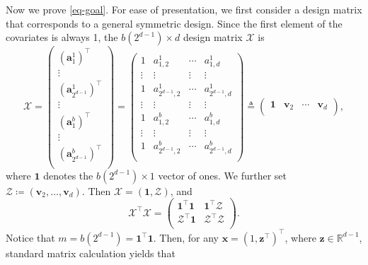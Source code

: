 \documentclass[ijoc,nonblindrev]{informs3}
\def\bx{{\bm x}}
\def\cX{{\mathcal X}}
\def\cZ{{\mathcal Z}}
\def\ba{{\bm a}}
\def\bv{{\bm v}}
\def\bz{{\bm z}}
\def\bone{{\bm 1}}
\begin{document}
Now we prove \eqref{eq-goal}.
For ease of presentation, we first consider a design matrix that corresponds to a general symmetric design.
Since the first element of the covariates is always 1, the $b(2^{d-1}) \times d$ design matrix $\cX$ is
\begin{equation*}
\cX =
\left(
  \begin{array}{c}
    (\ba_1^1)^\intercal \\
    \vdots \\
    (\ba_{2^{d-1}}^1)^\intercal \\
    \vdots \\
    (\ba_1^b)^\intercal \\
    \vdots \\
    (\ba_{2^{d-1}}^b)^\intercal \\
  \end{array}
\right)
=
\left(
  \begin{array}{cccc}
    1 &a_{1,2}^1 & \cdots & a_{1,d}^1 \\
    \vdots & \vdots & \vdots & \vdots \\
    1 & a_{2^{d-1},2}^1 & \cdots & a_{2^{d-1},d}^1 \\
    \vdots & \vdots & \vdots & \vdots \\
    1 & a_{1,2}^b & \cdots & a_{1,d}^b \\
    \vdots & \vdots & \vdots & \vdots \\
    1 & a_{2^{d-1},2}^b & \cdots & a_{2^{d-1},d}^b \\
  \end{array}
\right)
\triangleq
\left(
  \begin{array}{cccc}
    \bone & \bv_2 & \cdots & \bv_d \\
  \end{array}
\right),
\end{equation*}
where $\bone$ denotes the $b(2^{d-1}) \times 1$ vector of ones.
We further set  $\cZ \coloneqq (\bv_2, \ldots, \bv_d)$.
Then $\cX = (\bone, \cZ)$, and
\begin{equation}\label{eq-matrix}
\cX^\intercal \cX =
\left(
  \begin{array}{cc}
    \bone^\intercal \bone & \bone^\intercal \cZ \\
    \cZ^\intercal \bone & \cZ^\intercal \cZ \\
  \end{array}
\right).
\end{equation}
Notice that $m = b(2^{d-1}) = \bone^\intercal \bone$.
Then, for any $\bx = (1, \bz^\intercal)^\intercal$, where $\bz \in \mathbb{R}^{d-1}$, standard matrix calculation \cite[\S 0.8.5]{horn1990matrix_ec} yields that
\end{document}
